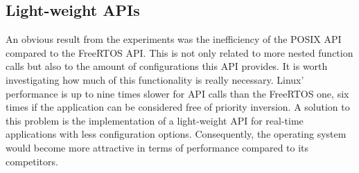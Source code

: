 \subsection{Light-weight APIs}
An obvious result from the experiments was the inefficiency of the POSIX \ac{API} compared to the FreeRTOS \ac{API}.
This is not only related to more nested function calls but also to the amount of configurations this \ac{API} provides.
It is worth investigating how much of this functionality is really necessary.
Linux' performance is up to nine times slower for \ac{API} calls than the FreeRTOS one, six times if the application can be considered free of priority inversion.
A solution to this problem is the implementation of a light-weight \ac{API} for real-time applications with less configuration options.
Consequently, the operating system would become more attractive in terms of performance compared to its competitors.


